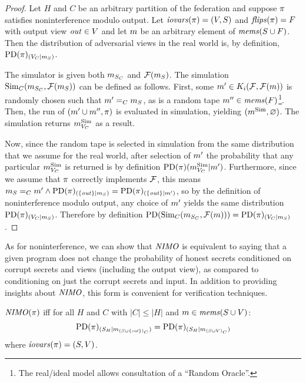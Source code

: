 \begin{proof}
  Let $H$ and $C$ be an arbitrary partition of the federation and
  suppose $\pi$ satisfies noninterference modulo output. Let
  $\mathit{iovars}(\pi) = (V,S)$ and $\mathit{flips}(\pi) = F$ with output view $\mathit{out}
  \in V$ and let $m$ be an arbitrary element of $\mathit{mems}(S \cup
  F)$. Then the distribution of adversarial views in the real world
  is, by definition,
  $\mathrm{PD}(\pi)_{({V_C}|{m_S})}$.

  The simulator is given both $m_{S_C}$ and
  $\mathcal{F}(m_S)$.  The simulation $\mathrm{Sim}_C(m_{S_C},
  \mathcal{F}(m_S))$ can be defined as follows. First, some $m'
  \in K_i(\mathcal{F},\mathcal{F}(m))$ is randomly chosen such that
  $m' =_C m_S$, as is a random tape $m'' \in
  \mathit{mems}(F)$\footnote{The real/ideal model allows consultation of a
  ``Random Oracle''.}. Then, the run of $(m' \cup m'',
  \pi)$ is evaluated in simulation, yielding $(m^{\mathrm{Sim}},\varnothing)$.
  The simulation returns $m^{\mathrm{Sim}}_{V_C}$ as a result.

  Now, since the random tape is selected in simulation from the same distribution
  that we assume for the real world, after selection of $m'$ the
  probability that any particular $m^{\mathrm{Sim}}_{V_C}$ is returned is by definition
  $
  \mathrm{PD}(\pi)(m^{\mathrm{Sim}}_{V_C} | m')
  $.
  Furthermore, since we assume that $\pi$ correctly implements $\mathcal{F}$, this
  means
  $
  m_S =_C m' \wedge
     \mathrm{PD}(\pi)_{({\{ \mathit{out} \}}|{m_S})} =
     \mathrm{PD}(\pi)_{({\{ \mathit{out} \}}|{m'})}
  $,
  so by the definition of noninterference modulo output,
  any choice of $m'$ yields the same distribution $\mathrm{PD}(\pi)_{({V_C}|{m_S})}$.
  Therefore by definition
  $
   \mathrm{PD}(\mathrm{Sim}_C(m_{S_C},\mathcal{F}(m))) = \mathrm{PD}(\pi)_{({V_C}|{m_S})}
  $.
\end{proof}

As for noninterference, we can show that $\mathit{NIMO}$ is equivalent
to saying that a given program does not change the probability
of honest secrets conditioned on corrupt secrets and views
(including the output view), as compared to conditioning on
just the corrupt secrets and input. In addition to providing
insights about $\mathit{NIMO}$, this form is convenient for
verification techniques. 
\begin{lemma}
  \label{lemma-nimo}
  $\mathit{NIMO}(\pi)$ iff for all $H$ and $C$ with $|C| \le |H|$ and
  $m \in \mathit{mems}(S \cup V)$:
  $$\mathrm{PD}(\pi)_{({S_H}|{m_{(S \cup \{\mathit{out}\})_C}})} =
  \mathrm{PD}(\pi)_{({S_H}|{m_{(S\cup V)_C}})} $$
  where  $\mathit{iovars}(\pi) = (S,V)$.
\end{lemma}
